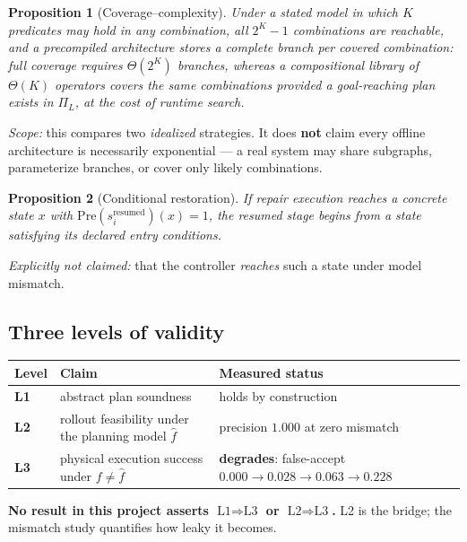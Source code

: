 \documentclass[11pt]{article}
\newtheorem{proposition}{Proposition}
\begin{document}
\begin{proposition}[Coverage--complexity]
Under a stated model in which $K$ predicates may hold in any combination, all
$2^K-1$ combinations are reachable, and a precompiled architecture stores a
complete branch per covered combination: full coverage requires $\Theta(2^K)$
branches, whereas a compositional library of $\Theta(K)$ operators covers the
same combinations provided a goal-reaching plan exists in $\Pi_L$, at the cost of
runtime search.
\end{proposition}
\emph{Scope:} this compares two \emph{idealized} strategies. It does
\textbf{not} claim every offline architecture is necessarily exponential --- a
real system may share subgraphs, parameterize branches, or cover only likely
combinations.

\begin{proposition}[Conditional restoration]
If repair execution reaches a concrete state $x$ with
$\mathrm{Pre}(s_i^{\mathrm{resumed}})(x)=1$, the resumed stage begins from a
state satisfying its declared entry conditions.
\end{proposition}
\emph{Explicitly not claimed:} that the controller \emph{reaches} such a state
under model mismatch.

\subsection{Three levels of validity}

\begin{center}
\begin{tabular}{p{}p{}p{}}
\toprule
Level & Claim & Measured status \\
\midrule
\textbf{L1} & abstract plan soundness & holds by construction \\
\textbf{L2} & rollout feasibility under the planning model $\hat f$ &
  precision $1.000$ at zero mismatch \\
\textbf{L3} & physical execution success under $f\neq\hat f$ &
  \textbf{degrades}: false-accept $0.000\to0.028\to0.063\to0.228$ \\
\bottomrule
\end{tabular}
\end{center}

\textbf{No result in this project asserts $\text{L1}\Rightarrow\text{L3}$ or
$\text{L2}\Rightarrow\text{L3}$.} L2 is the bridge; the mismatch study
quantifies how leaky it becomes.

\end{document}
